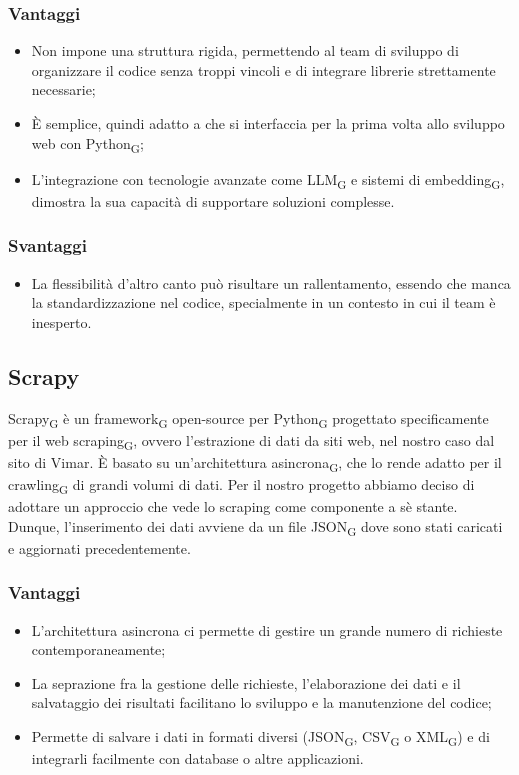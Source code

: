 \subsubsection{Vantaggi}
\begin{itemize}
    \item Non impone una struttura rigida, permettendo al team di sviluppo di organizzare il codice senza troppi vincoli e di integrare librerie strettamente necessarie;
    \item È semplice, quindi adatto a che si interfaccia per la prima volta allo sviluppo web con Python\textsubscript{G};
    \item L'integrazione con tecnologie avanzate come LLM\textsubscript{G} e sistemi di embedding\textsubscript{G}, dimostra la sua capacità di supportare soluzioni complesse.
\end{itemize}
\subsubsection{Svantaggi}
\begin{itemize}
    \item La flessibilità d'altro canto può risultare un rallentamento, essendo che manca la standardizzazione nel codice, specialmente in un contesto in cui il team è inesperto.
\end{itemize}

\subsection{Scrapy}
Scrapy\textsubscript{G} è un framework\textsubscript{G} open-source per Python\textsubscript{G} progettato specificamente per il web scraping\textsubscript{G}, ovvero l'estrazione di dati da siti web, nel nostro caso dal sito di Vimar. È basato su un'architettura asincrona\textsubscript{G}, che lo rende adatto per il crawling\textsubscript{G} di grandi volumi di dati. Per il nostro progetto abbiamo deciso di adottare un approccio che vede lo scraping come componente a sè stante. Dunque, l'inserimento dei dati avviene da un file JSON\textsubscript{G} dove sono stati caricati e aggiornati precedentemente.
\subsubsection{Vantaggi}
\begin{itemize}
    \item L'architettura asincrona ci permette di gestire un grande numero di richieste contemporaneamente;
    \item La seprazione fra la gestione delle richieste, l'elaborazione dei dati e il salvataggio dei risultati facilitano lo sviluppo e la manutenzione del codice;
    \item Permette di salvare i dati in formati diversi (JSON\textsubscript{G}, CSV\textsubscript{G} o XML\textsubscript{G}) e di integrarli facilmente con database o altre applicazioni.
\end{itemize}
